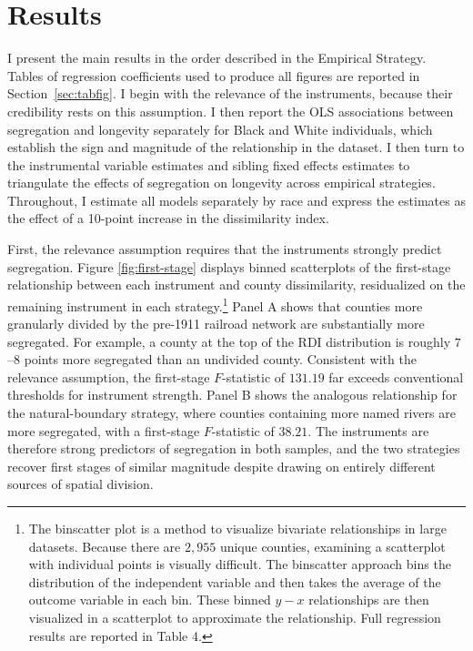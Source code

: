 \documentclass[11pt]{article}
\begin{document}
\section{Results}
I present the main results in the order described in the Empirical Strategy. Tables of regression coefficients used to produce all figures are reported in Section~\ref{sec:tabfig}. I begin with the relevance of the instruments, because their credibility rests on this assumption. I then report the OLS associations between segregation and longevity separately for Black and White individuals, which establish the sign and magnitude of the relationship in the dataset. I then turn to the instrumental variable estimates and sibling fixed effects estimates to triangulate the effects of segregation on longevity across empirical strategies. Throughout, I estimate all models separately by race and express the estimates as the effect of a 10-point increase in the dissimilarity index.

First, the relevance assumption requires that the instruments strongly predict segregation. Figure \ref{fig:first-stage} displays binned scatterplots of the first-stage relationship between each instrument and county dissimilarity, residualized on the remaining instrument in each strategy.\footnote{The binscatter plot is a method to visualize bivariate relationships in large datasets. Because there are $2{,}955$ unique counties, examining a scatterplot with individual points is visually difficult. The binscatter approach bins the distribution of the independent variable and then takes the average of the outcome variable in each bin. These binned $y-x$ relationships are then visualized in a scatterplot to approximate the relationship. Full regression results are reported in Table 4.} Panel A shows that counties more granularly divided by the pre-1911 railroad network are substantially more segregated. For example, a county at the top of the RDI distribution is roughly $7$--$8$ points more segregated than an undivided county. Consistent with the relevance assumption, the first-stage $F$-statistic of $131.19$ far exceeds conventional thresholds for instrument strength. Panel B shows the analogous relationship for the natural-boundary strategy, where counties containing more named rivers are more segregated, with a first-stage $F$-statistic of $38.21$. The instruments are therefore strong predictors of segregation in both samples, and the two strategies recover first stages of similar magnitude despite drawing on entirely different sources of spatial division.
\end{document}

